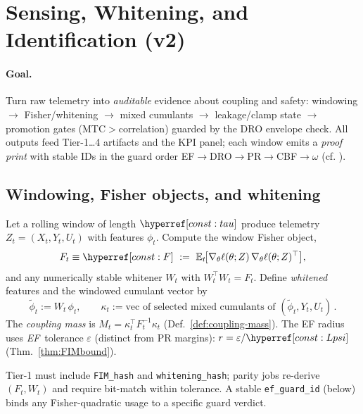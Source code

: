 \section{Sensing, Whitening, and Identification (v2)}\label{sec:sense-v2}

\paragraph{Goal.}
Turn raw telemetry into \emph{auditable} evidence about coupling and safety: windowing $\to$ Fisher/whitening $\to$ mixed cumulants $\to$ leakage/clamp state $\to$ promotion gates (MTC$>$correlation) guarded by the DRO envelope check. All outputs feed Tier-1…4 artifacts and the KPI panel; each window emits a \emph{proof print} with stable IDs in the guard order EF$\rightarrow$DRO$\rightarrow$PR$\rightarrow$CBF$\rightarrow\omega$ (cf. ).

\subsection{Windowing, Fisher objects, and whitening}\label{subsec:window-fim}
\emph{}

Let a rolling window of length $\constref{tau}$ produce telemetry $Z_t=(X_t,Y_t,U_t)$ with features $\phi_t$. Compute the window Fisher object,
\[
F_t \equiv \constref{F}\ :=\ \mathbb{E}_t\!\big[\nabla_\theta \ell(\theta;Z)\,\nabla_\theta \ell(\theta;Z)^\top\big],
\]
and any numerically stable whitener $W_t$ with $W_t^\top W_t=F_t$. Define \emph{whitened} features and the windowed cumulant vector by
\[
\tilde\phi_t:=W_t\,\phi_t,\qquad
\kappa_t := \text{vec of selected mixed cumulants of }(\tilde\phi_t,Y_t,U_t)\,.
\]
The \emph{coupling mass} is $M_t=\kappa_t^\top F_t^{-1}\kappa_t$ (Def.~\ref{def:coupling-mass}). The EF radius uses \emph{EF}~tolerance $\varepsilon$ (distinct from PR margins): $r=\varepsilon/\constref{Lpsi}$ (Thm.~\ref{thm:FIMbound}).


\begin{remark}\label{rem:white-hash}
Tier-1 must include \texttt{FIM\_hash} and \texttt{whitening\_hash}; parity jobs re-derive $(F_t,W_t)$ and require bit-match within tolerance. A stable \texttt{ef\_guard\_id} (below) binds any Fisher-quadratic usage to a specific guard verdict. 
\end{remark}

